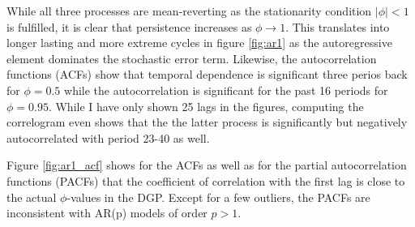 While all three processes are mean-reverting as the stationarity condition $|\phi|<1$ is fulfilled, it is clear that persistence increases as $\phi\rightarrow1$. This translates into longer lasting and more extreme cycles in figure \ref{fig:ar1} as the autoregressive element dominates the stochastic error term. Likewise, the autocorrelation functions (ACFs) show that temporal dependence is significant three perios back for $\phi=0.5$ while the autocorrelation is significant for the past 16 periods for $\phi=0.95$. While I have only shown 25 lags in the figures, computing the correlogram even shows that the the latter process is significantly but negatively autocorrelated with period 23-40 as well.

Figure \ref{fig:ar1_acf} shows for the ACFs as well as for the partial autocorrelation functions (PACFs) that the coefficient of correlation with the first lag is close to the actual $\phi$-values in the DGP. Except for a few outliers, the PACFs are inconsistent with AR(p) models of order $p>1$.

